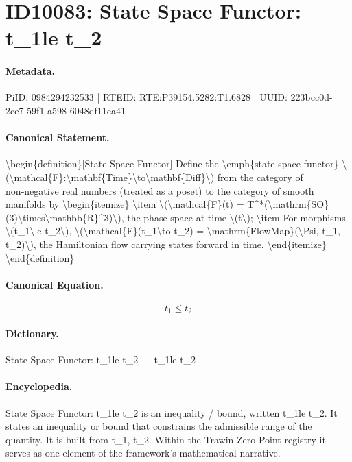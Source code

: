 \section*{ID10083: State Space Functor: t\_1le t\_2}
\paragraph{Metadata.}
PiID: 0984294232533 | RTEID: RTE:P39154.5282:T1.6828 | UUID: 223bcc0d-2ce7-59f1-a598-6048df11ca41

\paragraph{Canonical Statement.}
\textbackslash{}begin\{definition\}[State Space Functor] Define the \textbackslash{}emph\{state space functor\} \textbackslash{}(\textbackslash{}mathcal\{F\}:\textbackslash{}mathbf\{Time\}\textbackslash{}to\textbackslash{}mathbf\{Diff\}\textbackslash{}) from the category of non‑negative real numbers (treated as a poset) to the category of smooth manifolds by \textbackslash{}begin\{itemize\} \textbackslash{}item \textbackslash{}(\textbackslash{}mathcal\{F\}(t) = T\textasciicircum{}*(\textbackslash{}mathrm\{SO\}(3)\textbackslash{}times\textbackslash{}mathbb\{R\}\textasciicircum{}3)\textbackslash{}), the phase space at time \textbackslash{}(t\textbackslash{}); \textbackslash{}item For morphisms \textbackslash{}(t\_1\textbackslash{}le t\_2\textbackslash{}), \textbackslash{}(\textbackslash{}mathcal\{F\}(t\_1\textbackslash{}to t\_2) = \textbackslash{}mathrm\{FlowMap\}(\textbackslash{}Psi, t\_1, t\_2)\textbackslash{}), the Hamiltonian flow carrying states forward in time. \textbackslash{}end\{itemize\} \textbackslash{}end\{definition\}

\paragraph{Canonical Equation.}
\[
t_1\le t_2
\]

\paragraph{Dictionary.}
State Space Functor: t\_1le t\_2 — t\_1le t\_2

\paragraph{Encyclopedia.}
State Space Functor: t\_1le t\_2 is an inequality / bound, written t\_1le t\_2. It states an inequality or bound that constrains the admissible range of the quantity. It is built from t\_1, t\_2. Within the Trawin Zero Point registry it serves as one element of the framework's mathematical narrative.

